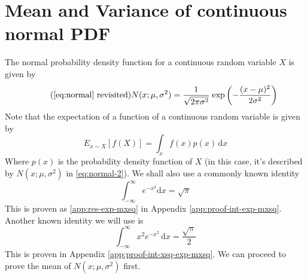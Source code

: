 \documentclass[main.tex]{article}
\begin{document}
    \section[P5: Prove \texorpdfstring{$\mu$}{mean} and \texorpdfstring{$\sigma^2$}{variance} of \texorpdfstring{$N(x; \mu, \sigma^2)$}{Normal distribution}]{Mean and Variance of continuous normal PDF}
    The normal probability density function for a continuous random variable $X$ is given by
    \begin{equation}
        \tag{\ref{eq:normal} revisited}
        N(x; \mu, \sigma^2) = \frac{1}{\sqrt{2\pi \sigma^2}} \; \mathrm{exp} \left ( -\frac{(x-\mu)^2}{2\sigma^2} \right )
        \label{eq:normal-2}
    \end{equation}
    Note that the expectation of a function of a continuous random variable is given by
    \begin{equation}
        E_{x \sim X} [f(X)] = \int_{x} f(x) p(x) \, \mathrm{d}x
    \end{equation}
    Where $p(x)$ is the probability density function of $X$ (in this case, it's described by $N(x; \mu, \sigma^2)$ in \ref{eq:normal-2}). We shall also use a commonly known identity
    \begin{equation}
        \label{eq:int-exp-mxsq}
        \int_{-\infty}^{\infty} e^{-x^2} \mathrm{d}x = \sqrt{\pi}
    \end{equation}
    This is proven as \ref{app:res-exp-mxsq} in Appendix \ref{app:proof-int-exp-mxsq}. Another known identity we will use is
    \begin{equation}
        \label{eq:int-xsq-exp-mxsq}
        \int_{-\infty}^{\infty} x^2 e^{-x^2} \, \mathrm{d}x = \frac{\sqrt{\pi}}{2}
    \end{equation}
    This is proven in Appendix \ref{app:proof-int-xsq-exp-mxsq}.
    We can proceed to prove the mean of $N(x; \mu, \sigma^2)$ first.
\end{document}
